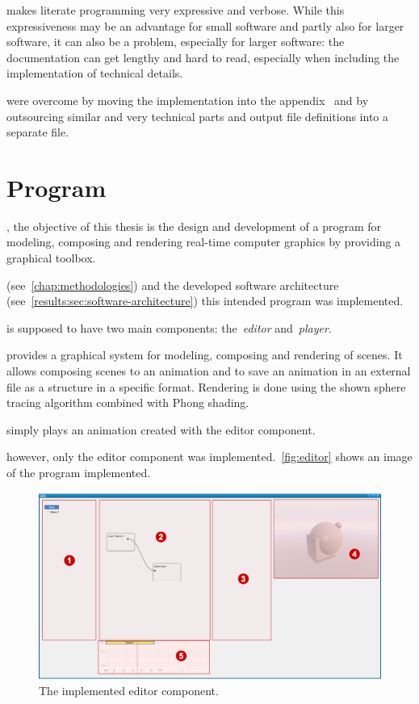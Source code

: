 \documentclass[%
    a4paper,    %
    justified,  %
    nobib,      %
    openany     %
]{tufte-book}
\begin{document}
 makes literate programming very
expressive and verbose. While this expressiveness may be an advantage for small
software and partly also for larger software, it can also be a problem,
especially for larger software: the documentation can get lengthy and hard to
read, especially when including the implementation of technical details.

 were overcome by moving the implementation into the
appendix~ and by outsourcing similar
and very technical parts and output file definitions into a separate
file.~

\section{Program}
\label{results:sec:program}

, the objective of this thesis is the design and
development of a program for modeling, composing and rendering real-time
computer graphics by providing a graphical toolbox.

(see~\ref{chap:methodologies}) and the developed software architecture
(see~\ref{results:sec:software-architecture}) this intended program was
implemented.

 is supposed to have two main components:
the~\textit{editor} and~\textit{player}.

 provides a graphical system for modeling,
composing and rendering of scenes. It allows composing scenes to an animation
and to save an animation in an external file as a structure in a specific
format. Rendering is done using the shown sphere tracing algorithm combined with
Phong shading.

 simply plays an animation created with the
editor component.

 however, only the editor component was
implemented.~\autoref{fig:editor} shows an image of the program implemented.

\begin{figure}[ht]
  \caption{The implemented editor component.}
  \label{fig:editor}
  \includegraphics[width=0.95\linewidth]{images/editor-components}
\end{figure}
\end{document}
